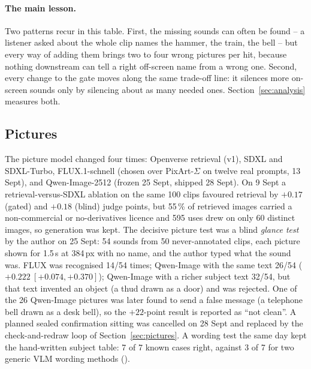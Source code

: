 \paragraph{The main lesson.} Two patterns recur in this table. First, the missing sounds can often be found -- a
listener asked about the whole clip names the hammer, the train, the bell -- but every way of adding them brings two
to four wrong pictures per hit, because nothing downstream can tell a right off-screen name from a wrong one. Second,
every change to the gate moves along the same trade-off line: it silences more on-screen sounds only by silencing
about as many needed ones. Section~\ref{sec:analysis} measures both.

\subsection{Pictures}\label{sec:pic-history}
The picture model changed four times: Openverse retrieval (v1), SDXL and SDXL-Turbo, FLUX.1-schnell (chosen over
PixArt-$\Sigma$ on twelve real prompts, 13 Sept), and Qwen-Image-2512 (frozen 25 Sept, shipped 28 Sept). On 9 Sept a
retrieval-versus-SDXL ablation on the same 100 clips favoured retrieval by $+0.17$ (gated) and $+0.18$ (blind) judge
points, but 55\,\% of retrieved images carried a non-commercial or no-derivatives licence and 595 uses drew on only 60
distinct images, so generation was kept. The decisive picture test was a blind \emph{glance test} by the author on 25
Sept: 54 sounds from 50 never-annotated clips, each picture shown for 1.5\,s at 384\,px with no name, and the author
typed what the sound was. FLUX was recognised 14/54 times; Qwen-Image with the same text 26/54
($+0.222\ [+0.074, +0.370]$); Qwen-Image with a richer subject text 32/54, but that text invented an object (a thud
drawn as a door) and was rejected. One of the 26 Qwen-Image pictures was later found to send a false message (a
telephone bell drawn as a desk bell), so the $+22$-point result is reported as ``not clean''. A planned sealed
confirmation sitting was cancelled on 28 Sept and replaced by the check-and-redraw loop of Section~\ref{sec:pictures}.
A wording test the same day kept the hand-written subject table: 7 of 7 known cases right, against 3 of 7 for two
generic VLM wording methods ().

